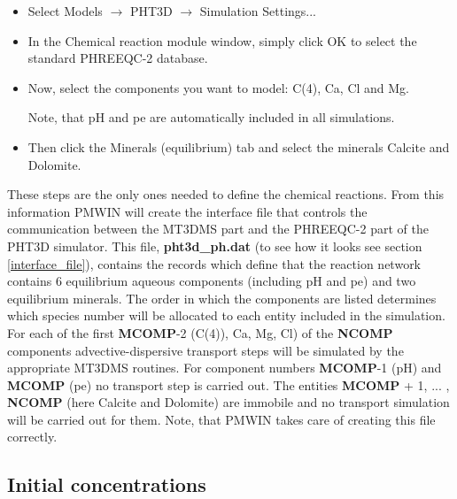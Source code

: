 \begin{itemize}

\item Select Models $\rightarrow$ PHT3D $\rightarrow$ Simulation Settings...

\item In the Chemical reaction module window, simply click OK to select the standard PHREEQC-2 database.

\item Now, select the components you want to model: C(4), Ca, Cl and Mg. 

Note, that pH and pe are automatically included in all simulations. 

\item Then click the Minerals (equilibrium) tab and select the minerals Calcite and Dolomite.

\end{itemize}

These steps are the only ones needed to define the chemical reactions. From
this information PMWIN will create the interface file that controls the communication
between the MT3DMS part and the PHREEQC-2 part of the PHT3D simulator. 
This file, {\color{red} \textbf{pht3d\_ph.dat}} (to see how it looks see 
section \ref{interface_file}), contains the records which define that the 
reaction network contains 6 equilibrium aqueous components 
(including pH and pe) and two equilibrium minerals. 
The order in which the components are listed determines which species number will 
be allocated to each entity included in the simulation. 
For each of the first {\color{red} \textbf{MCOMP}}-2 (C(4)), Ca, Mg, Cl) 
of the {\color{red} \textbf{NCOMP}} components advective-dispersive transport steps will 
be simulated by the appropriate MT3DMS routines. 
For component numbers {\color{red} \textbf{MCOMP}}-1 (pH) and 
{\color{red} \textbf{MCOMP}} (pe) no transport step is carried out. 
The entities {\color{red} \textbf{MCOMP}} + 1, ... ,{\color{red} \textbf{NCOMP}} (here Calcite
and Dolomite) are immobile and no transport simulation will be carried out for them.
Note, that PMWIN takes care of creating this file correctly. 

\subsection[Initial concentrations]{Initial concentrations}

